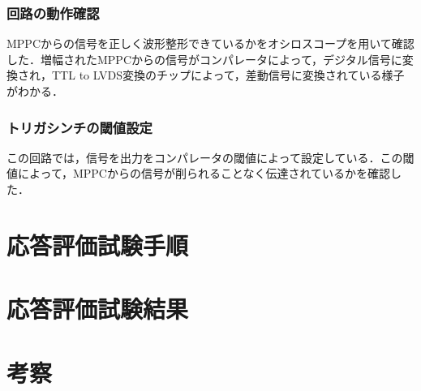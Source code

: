 \subsubsection*{回路の動作確認}
MPPCからの信号を正しく波形整形できているかをオシロスコープを用いて確認した．増幅されたMPPCからの信号がコンパレータによって，デジタル信号に変換され，TTL to LVDS変換のチップによって，差動信号に変換されている様子がわかる．

\subsubsection*{トリガシンチの閾値設定}
この回路では，信号を出力をコンパレータの閾値によって設定している．この閾値によって，MPPCからの信号が削られることなく伝達されているかを確認した．

\section{応答評価試験手順}
\label{sec:exthow}
\section{応答評価試験結果}
\label{sec:extconc}
\section{考察}
\label{sec:extsum}
